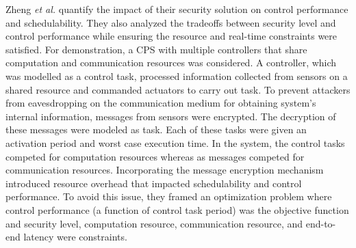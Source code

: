 Zheng \textit{et al.} \cite{ZDRP16} quantify the impact of their security solution on control performance and schedulability. They also analyzed the tradeoffs between security level and control performance while ensuring the resource and real-time constraints were satisfied. For demonstration, a CPS with multiple controllers that share computation and communication resources was considered. A controller, which was modelled as a control task, processed information collected from sensors on a shared resource and commanded actuators to carry out task. To prevent attackers from eavesdropping on the communication medium for obtaining system's internal information, messages from sensors were encrypted. The decryption of these messages were modeled as task. Each of these tasks were given an activation period and worst case execution time. In the system, the control tasks competed for computation resources whereas as messages competed for communication resources. Incorporating the message encryption mechanism introduced resource overhead that impacted schedulability and control performance. To avoid this issue, they framed an optimization problem where control performance (a function of control task period) was the objective function and security level, computation resource, communication resource, and end-to-end latency were constraints. %


